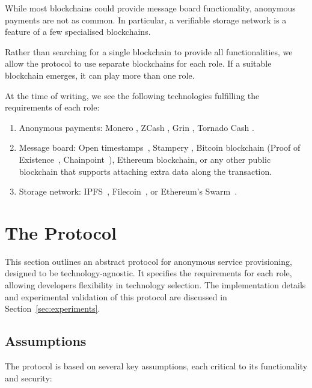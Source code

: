 \documentclass[pdftex,twocolumn,epjc3]{svjour3}
\begin{document}
{While most blockchains could provide message board functionality, anonymous payments are not as common. In particular, a verifiable storage network is a feature of a few specialised blockchains.

Rather than searching for a single blockchain to provide all functionalities, we allow the protocol to use separate blockchains for each role. If a suitable blockchain emerges, it can play more than one role.

At the time of writing, we see the following technologies fulfilling the requirements of each role:

\begin{enumerate}
\def\labelenumi{\arabic{enumi}.}

\item Anonymous payments: Monero \cite{vansaberhagenCryptoNote2013}, ZCash
  \cite{ben-sassonZerocashDecentralizedAnonymous2014}, Grin \cite{fuchsbauerAggregateCashSystems2019},
  Tornado Cash \cite{pertsevTornadoCashPrivacy2019}.
\item Message board: Open timestamps~\cite{opentimestampsTimestampingProofStandard}, Stampery \cite{crespoStamperyBlockchainTimestamping2017}, Bitcoin blockchain (Proof of Existence~\cite{proofofexistenceWebApplicationProve}, Chainpoint~\cite{chainpointBlockchainProofAnchoring}), Ethereum blockchain, or any other public blockchain that supports attaching extra data along the transaction.
\item Storage network: IPFS~\cite{benetIPFSContentAddressed2014}, Filecoin~\cite{protocollabsFilecoinDecentralizedStorage2017}, or Ethereum's
  Swarm~\cite{teamSWARMStorageCommunication2021}.
\end{enumerate}


\section{The Protocol}\label{sec:protocol}
This section outlines an abstract protocol for anonymous service provisioning, designed to be technology-agnostic. It specifies the requirements for each role, allowing developers flexibility in technology selection. The implementation details and experimental validation of this protocol are discussed in Section~\ref{sec:experiments}.

\subsection{Assumptions}
The protocol is based on several key assumptions, each critical to its functionality and security:

}
\end{document}
